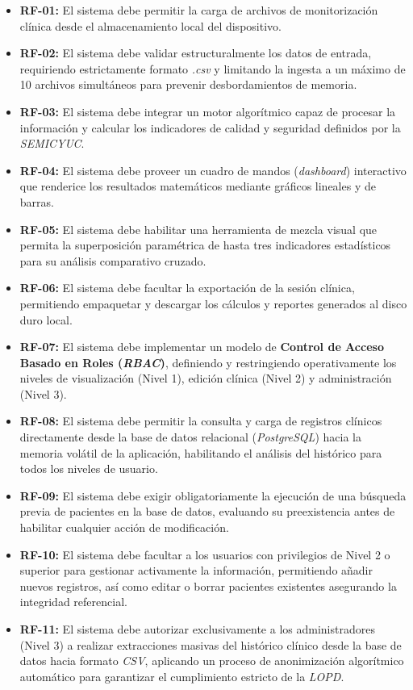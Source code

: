 \begin{itemize}
    \item \textbf{RF-01:} El sistema debe permitir la carga de archivos de monitorización clínica desde el almacenamiento local del dispositivo.
    \item \textbf{RF-02:} El sistema debe validar estructuralmente los datos de entrada, requiriendo estrictamente formato \textit{.csv} y limitando la ingesta a un máximo de 10 archivos simultáneos para prevenir desbordamientos de memoria.
    \item \textbf{RF-03:} El sistema debe integrar un motor algorítmico capaz de procesar la información y calcular los indicadores de calidad y seguridad definidos por la \textit{SEMICYUC}.
    \item \textbf{RF-04:} El sistema debe proveer un cuadro de mandos (\textit{dashboard}) interactivo que renderice los resultados matemáticos mediante gráficos lineales y de barras.
    \item \textbf{RF-05:} El sistema debe habilitar una herramienta de mezcla visual que permita la superposición paramétrica de hasta tres indicadores estadísticos para su análisis comparativo cruzado.
    \item \textbf{RF-06:} El sistema debe facultar la exportación de la sesión clínica, permitiendo empaquetar y descargar los cálculos y reportes generados al disco duro local.
    \item \textbf{RF-07:} El sistema debe implementar un modelo de \textbf{Control de Acceso Basado en Roles (\textit{RBAC})}, definiendo y restringiendo operativamente los niveles de visualización (Nivel 1), edición clínica (Nivel 2) y administración (Nivel 3).
    \item \textbf{RF-08:} El sistema debe permitir la consulta y carga de registros clínicos directamente desde la base de datos relacional (\textit{PostgreSQL}) hacia la memoria volátil de la aplicación, habilitando el análisis del histórico para todos los niveles de usuario.
    \item \textbf{RF-09:} El sistema debe exigir obligatoriamente la ejecución de una búsqueda previa de pacientes en la base de datos, evaluando su preexistencia antes de habilitar cualquier acción de modificación.
    \item \textbf{RF-10:} El sistema debe facultar a los usuarios con privilegios de Nivel 2 o superior para gestionar activamente la información, permitiendo añadir nuevos registros, así como editar o borrar pacientes existentes asegurando la integridad referencial.
    \item \textbf{RF-11:} El sistema debe autorizar exclusivamente a los administradores (Nivel 3) a realizar extracciones masivas del histórico clínico desde la base de datos hacia formato \textit{CSV}, aplicando un proceso de anonimización algorítmico automático para garantizar el cumplimiento estricto de la \textit{LOPD}.
\end{itemize}

